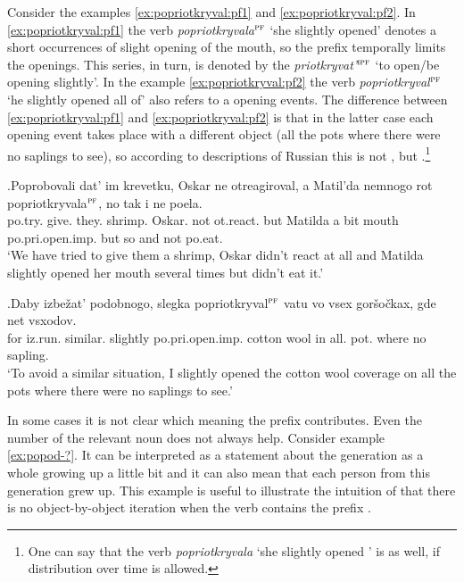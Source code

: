 Consider the examples \ref{ex:popriotkryval:pf1} and \ref{ex:popriotkryval:pf2}. In \ref{ex:popriotkryval:pf1} the verb \textit{popriotkryvala}$^{\textsc{pf}}$ `she slightly opened' denotes a short  occurrences of slight opening of the mouth, so the prefix  temporally limits the  openings. This series, in turn, is denoted by the  \textit{priotkryvat'}$^{\textsc{ipf}}$ `to open/be opening slightly'. In the example \ref{ex:popriotkryval:pf2} the verb  \textit{popriotkryval}$^{\textsc{pf}}$ `he slightly opened all of' also refers to a  opening events. The difference between \ref{ex:popriotkryval:pf1} and \ref{ex:popriotkryval:pf2} is that in the latter case each opening event takes place with a different object (all the pots where there were no saplings to see), so according to descriptions of Russian  this  is not , but .\footnote{One can say that the verb \textit{popriotkryvala} `she slightly opened ' is  as well, if distribution over time is allowed.}

\exg.\label{ex:popriotkryval:pf1}Poprobovali dat' im krevetku, Oskar ne otreagiroval, a Matil'da nemnogo rot popriotkryvala$^{\textsc{pf}}$, no tak i ne poela.\\
po.try. give. they. shrimp. Oskar. not ot.react. but Matilda {a bit} mouth po.pri.open.imp. but so and not po.eat.\\
\trans `We have tried to give them a shrimp, Oskar didn't react at all and Matilda slightly opened her mouth several times but didn't eat it.'\\

\exg.\label{ex:popriotkryval:pf2}Daby izbe\v{z}at' podobnogo, slegka popriotkryval$^{\textsc{pf}}$ vatu vo vsex gor\v{s}o\v{c}kax, gde net vsxodov.\\
for iz.run. similar. slightly po.pri.open.imp. {cotton wool} in all. pot. where no sapling.\\
\trans `To avoid a similar situation, I slightly opened the cotton wool coverage on all the pots where there were no saplings to see.'\\

In some cases it is not clear which meaning the prefix contributes. Even the number of the relevant noun does not always help. Consider example \ref{ex:popod-?}. It can be interpreted as a statement about the generation as a whole growing up a little bit and it can also mean that each person from this generation grew up. This example is useful to illustrate the intuition of \citet{Isachenko:60} that there is no object-by-object iteration when the verb contains the  prefix .

